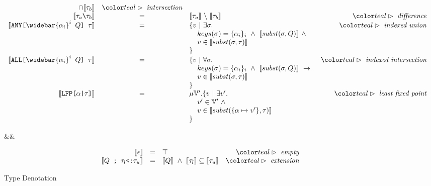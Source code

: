 \documentclass[acmsmall]{acmart}
\theoremstyle{definition}
\begin{document}
\begin{figure*}[h]
\[\begin{array}{rclr}
\cap
\llbracket \tau_b \rrbracket 
& \C{intersection}
\\
\llbracket \code{$\tau_a$\textbackslash$\tau_b$} \rrbracket 
&=& 
\llbracket \tau_a \rrbracket 
\ \backslash\ 
\llbracket \tau_b \rrbracket 
& \C{difference}
\\
\llbracket \code{ANY[$\widebar{\alpha_i}^i$ $Q$] $\tau$} \rrbracket 
&=& 
\begin{array}[t]{@{}l}
\{ v \ |\  \exists \sigma . 
\\ \I keys(\sigma) = \{\alpha_i\}_i\ \land\ \llbracket subst(\sigma, Q) \rrbracket \ \land\ 
\\ \I v \in \llbracket subst(\sigma, \tau) \rrbracket
\\
\}
\end{array}
& 
\C{indexed union}
\\
\llbracket \code{ALL[$\widebar{\alpha_i}^i$ $Q$] $\tau$} \rrbracket 
&=& 
\begin{array}[t]{@{}l}
\{ v \ |\  \forall \sigma . 
\\ \I keys(\sigma) = \{\alpha_i\}_i\ \land\ \llbracket subst(\sigma, Q) \rrbracket \ \rightarrow  
\\ \I v \in \llbracket subst(\sigma, \tau) \rrbracket
\\
\}
\end{array}
& 
\C{indexed intersection}
\\
\llbracket \code{LFP[$\alpha$|$\tau$]} \rrbracket 
&=& 
\begin{array}[t]{@{}l}
\mu  \mathbb{V}' . \{ v  \ |\  \exists v' . 
\\ \I v' \in \mathbb{V}' \ \land\ 
\\ \I v \in \llbracket subst(\{\alpha \mapsto v'\}, \tau) \rrbracket
\\
\}
\end{array}
& 
\C{least fixed point}
\end{array}
\]
\begin{flalign*}
  &&
\end{flalign*}
\[
\begin{array}{rclr}
\llbracket \epsilon \rrbracket 
&=& 
\top
& \C{empty} 
\\
\llbracket \code{$Q$ ; $\tau_l$<:$\tau_u$} \rrbracket 
&=& 
\llbracket Q \rrbracket \ \land\ \llbracket \tau_l \rrbracket \subseteq \llbracket \tau_u \rrbracket
& \C{extension} 
\end{array}
\]
\caption{Type Denotation}
\label{fig:type_denotation}
\end{figure*}
\end{document}
